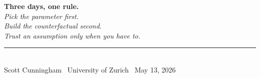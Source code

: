 \documentclass[aspectratio=169,11pt]{beamer}
\begin{document}
\begin{frame}[plain]
\centering
\vspace{2.5em}
{\Huge\bfseries\color{forest} Three days, one rule.}\\[1.5em]
{\Large\itshape\color{charcoal} Pick the parameter first.\\Build the counterfactual second.\\Trust an assumption only when you have to.}\\[2em]
\rule{0.4\textwidth}{0.6pt}\\[0.8em]
{\small\color{warmgray} Scott Cunningham \textperiodcentered\ University of Zurich \textperiodcentered\ May 13, 2026}
\end{frame}
\end{document}
